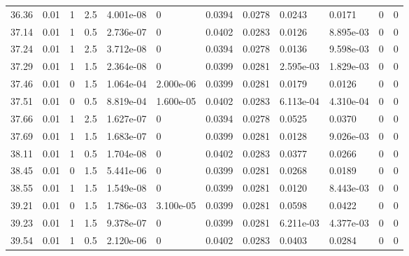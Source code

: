 \documentclass[preview]{standalone}
\begin{document}
{{{{{\begin{tabular}{L{1.2cm}C{1.2cm} C{0.3cm}C{0.5cm} C{1.4cm}C{1.4cm} C{1.4cm}C{1.4cm} C{1.6cm}C{1.6cm} C{1.6cm}C{1.6cm}}
  36.36  &  0.01  & 1     & 2.5 &  4.001e-08  & 0  &  0.0394&   0.0278& 0.0243 & 0.0171   &  0 & 0  \\ 
  37.14  &  0.01  & 1     & 0.5 &  2.736e-07  & 0  &  0.0402&   0.0283& 0.0126 & 8.895e-03   &  0 & 0  \\ 
  37.24  &  0.01  & 1     & 2.5 &  3.712e-08  & 0  &  0.0394&   0.0278& 0.0136 & 9.598e-03   &  0 & 0  \\ 
  37.29  &  0.01  & 1     & 1.5 &  2.364e-08  & 0  &  0.0399&   0.0281& 2.595e-03 & 1.829e-03   &  0 & 0  \\ 
  37.46  &  0.01  & 0     & 1.5 &  1.064e-04  & 2.000e-06  &  0.0399&   0.0281& 0.0179 & 0.0126   &  0 & 0  \\ 
  37.51  &  0.01  & 0     & 0.5 &  8.819e-04  & 1.600e-05  &  0.0402&   0.0283& 6.113e-04 & 4.310e-04   &  0 & 0  \\ 
  37.66  &  0.01  & 1     & 2.5 &  1.627e-07  & 0  &  0.0394&   0.0278& 0.0525 & 0.0370   &  0 & 0  \\ 
  37.69  &  0.01  & 1     & 1.5 &  1.683e-07  & 0  &  0.0399&   0.0281& 0.0128 & 9.026e-03   &  0 & 0  \\ 
  38.11  &  0.01  & 1     & 0.5 &  1.704e-08  & 0  &  0.0402&   0.0283& 0.0377 & 0.0266   &  0 & 0  \\ 
  38.45  &  0.01  & 0     & 1.5 &  5.441e-06  & 0  &  0.0399&   0.0281& 0.0268 & 0.0189   &  0 & 0  \\ 
  38.55  &  0.01  & 1     & 1.5 &  1.549e-08  & 0  &  0.0399&   0.0281& 0.0120 & 8.443e-03   &  0 & 0  \\ 
  39.21  &  0.01  & 0     & 1.5 &  1.786e-03  & 3.100e-05  &  0.0399&   0.0281& 0.0598 & 0.0422   &  0 & 0  \\ 
  39.23  &  0.01  & 1     & 1.5 &  9.378e-07  & 0  &  0.0399&   0.0281& 6.211e-03 & 4.377e-03   &  0 & 0  \\ 
  39.54  &  0.01  & 1     & 0.5 &  2.120e-06  & 0  &  0.0402&   0.0283& 0.0403 & 0.0284   &  0 & 0  \\ 
\hline 
\end{tabular} 

}}}}}
\end{document}
